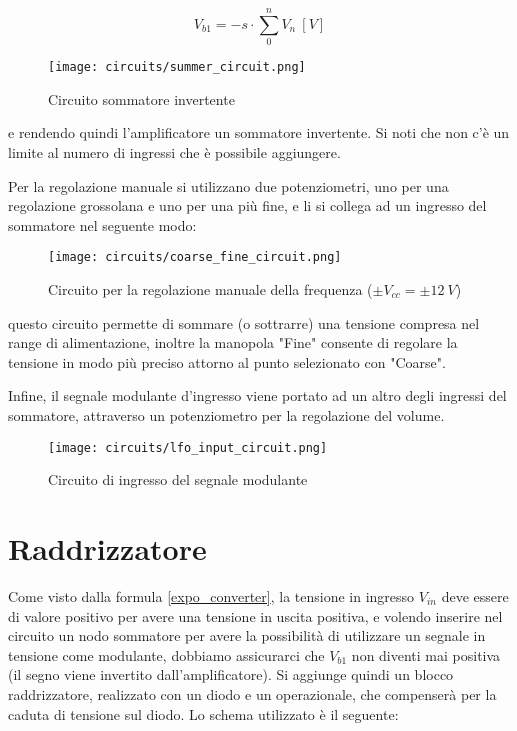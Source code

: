 \begin{equation}
    V_{b1}=-s\cdot\sum_0^n{V_{n}}\ [V]
\end{equation}

\begin{figure}[H]
    \centering
    \texttt{[image: circuits/summer\_circuit.png]}
    \caption{Circuito sommatore invertente}
    \label{summer_circuit}
\end{figure}

e rendendo quindi l'amplificatore un sommatore invertente. Si noti che non c'è un limite al
numero di ingressi che è possibile aggiungere.

Per la regolazione manuale si utilizzano due potenziometri, uno per una regolazione grossolana
e uno per una più fine, e li si collega ad un ingresso del sommatore nel seguente modo:

\begin{figure}[H]
    \centering
    \texttt{[image: circuits/coarse\_fine\_circuit.png]}
    \caption{Circuito per la regolazione manuale della frequenza ($\pm V_{cc}=\pm12\ V$)}
    \label{coarse_fine_circuit}
\end{figure}

questo circuito permette di sommare (o sottrarre) una tensione compresa nel range di
alimentazione, inoltre la manopola "Fine" consente di regolare la tensione in modo più
preciso attorno al punto selezionato con "Coarse".

Infine, il segnale modulante d'ingresso viene portato ad un altro degli ingressi del sommatore,
attraverso un potenziometro per la regolazione del volume.

\begin{figure}[H]
    \centering
    \texttt{[image: circuits/lfo\_input\_circuit.png]}
    \caption{Circuito di ingresso del segnale modulante}
    \label{lfo_input_circuit}
\end{figure}


\section{Raddrizzatore}


Come visto dalla formula \ref{expo_converter}, la tensione in ingresso $V_{in}$ deve essere di
valore positivo per avere una tensione in uscita positiva, e volendo inserire nel circuito
un nodo sommatore per avere la possibilità di utilizzare un segnale in tensione come modulante,
dobbiamo assicurarci che $V_{b1}$ non diventi mai positiva (il segno viene invertito
dall'amplificatore). Si aggiunge quindi un blocco raddrizzatore, realizzato con un diodo e
un operazionale, che compenserà per la caduta di tensione sul diodo. Lo schema utilizzato
è il seguente:

